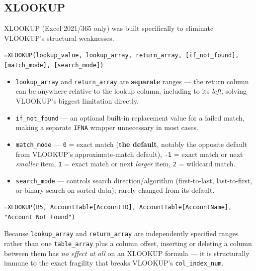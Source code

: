 \documentclass[11pt,a4paper]{article}
\begin{document}
\subsection{XLOOKUP}
\label{sec:xlookup}

XLOOKUP (Excel 2021/365 only) was built specifically to eliminate VLOOKUP's structural weaknesses.

\begin{formulasyntax}[XLOOKUP]
\texttt{=XLOOKUP(lookup\_value, lookup\_array, return\_array, [if\_not\_found], [match\_mode], [search\_mode])}
\begin{itemize}
  \item \texttt{lookup\_array} and \texttt{return\_array} are \textbf{separate} ranges --- the return column can be anywhere relative to the lookup column, including to its \emph{left}, solving VLOOKUP's biggest limitation directly.
  \item \texttt{if\_not\_found} --- an optional built-in replacement value for a failed match, making a separate \texttt{IFNA} wrapper unnecessary in most cases.
  \item \texttt{match\_mode} --- \texttt{0} = exact match (\textbf{the default}, notably the opposite default from VLOOKUP's approximate-match default), \texttt{-1} = exact match or next \emph{smaller} item, \texttt{1} = exact match or next \emph{larger} item, \texttt{2} = wildcard match.
  \item \texttt{search\_mode} --- controls search direction/algorithm (first-to-last, last-to-first, or binary search on sorted data); rarely changed from its default.
\end{itemize}
\end{formulasyntax}

\begin{lstlisting}[style=excelstyle, caption={XLOOKUP solving VLOOKUP's left-lookup problem directly, with a built-in not-found message}]
=XLOOKUP(B5, AccountTable[AccountID], AccountTable[AccountName], "Account Not Found")
\end{lstlisting}

\begin{keyconcept}
Because \texttt{lookup\_array} and \texttt{return\_array} are independently specified ranges rather than one \texttt{table\_array} plus a column offset, inserting or deleting a column between them has \emph{no effect at all} on an XLOOKUP formula --- it is structurally immune to the exact fragility that breaks VLOOKUP's \texttt{col\_index\_num}.
\end{keyconcept}
\end{document}

